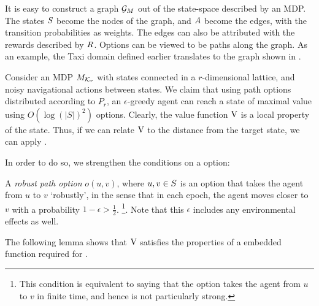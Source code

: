 It is easy to construct a graph $\mathcal{G}_{M}$ out of the state-space
described by an MDP. The states $S$ become the nodes of the graph,
and $A$ become the edges, with the transition probabilities as
weights. The edges can also be attributed with the rewards described by
$R$. Options can be viewed to be paths along the graph. As an
example, the Taxi domain defined earlier translates to the graph shown
in .

Consider an MDP $M_{\mathcal{K}_r}$ with states connected in
a $r$-dimensional lattice, and noisy navigational actions between
states. We claim that using path options distributed according to $P_r$,
an $\epsilon$-greedy agent can reach a state of maximal value using
$O(\log(|S|)^2)$ options. Clearly, the value function $\operatorname{V}$ is a local
property of the state. Thus, if we can relate $\operatorname{V}$ to the distance from
the target state, we can apply .

In order to do so, we strengthen the conditions on a option: 
\begin{definition}
    A {\em robust path option} $o(u,v)$, where $u,v \in S$ is an
    option that takes the agent from $u$ to $v$ `robustly', in the
    sense that in each epoch, the agent moves closer to $v$ with a
    probability $1-\epsilon > \frac{1}{2}$. \footnote{This condition
    is equivalent to saying that the option takes the agent from $u$
    to $v$ in finite time, and hence is not particularly strong.}.
    Note that this $\epsilon$ includes any environmental effects as
    well.
\end{definition}

The following lemma shows that $\operatorname{V}$ satisfies the properties of a
embedded function required for . 

